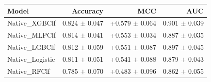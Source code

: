\begin{tabular}{lrrr}
\toprule
Model & Accuracy & MCC & AUC \\
\midrule
Native\_XGBClf & 0.824 $\pm$ 0.047 & +0.579 $\pm$ 0.064 & 0.901 $\pm$ 0.039 \\
Native\_MLPClf & 0.814 $\pm$ 0.041 & +0.553 $\pm$ 0.034 & 0.887 $\pm$ 0.035 \\
Native\_LGBClf & 0.812 $\pm$ 0.059 & +0.551 $\pm$ 0.087 & 0.897 $\pm$ 0.045 \\
Native\_Logistic & 0.811 $\pm$ 0.051 & +0.541 $\pm$ 0.088 & 0.879 $\pm$ 0.043 \\
Native\_RFClf & 0.785 $\pm$ 0.070 & +0.483 $\pm$ 0.096 & 0.862 $\pm$ 0.055 \\
\bottomrule
\end{tabular}